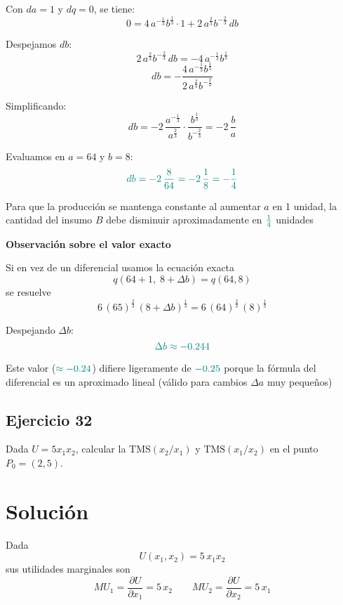 \documentclass{article}
\begin{document}
Con \(da = 1\) y \(dq = 0\), se tiene:
\[
0 = 4\, a^{-\frac{1}{3}}b^{\frac{1}{3}} \cdot 1 + 2\, a^{\frac{2}{3}}b^{-\frac{2}{3}}\, db
\]

Despejamos \(db\):
\[
2\, a^{\frac{2}{3}}b^{-\frac{2}{3}}\, db = -4\, a^{-\frac{1}{3}}b^{\frac{1}{3}}
\]
\[
db = -\frac{4\, a^{-\frac{1}{3}}b^{\frac{1}{3}}}{2\, a^{\frac{2}{3}}b^{-\frac{2}{3}}}
\]

Simplificando:
\[
db = -2\, \frac{a^{-\frac{1}{3}}}{a^{\frac{2}{3}}} \cdot \frac{b^{\frac{1}{3}}}{b^{-\frac{2}{3}}} = -2\, \frac{b}{a}
\]

Evaluamos en \(a = 64\) y \(b = 8\):
\[
\color{teal}
db = -2\, \frac{8}{64} = -2\, \frac{1}{8} = -\frac{1}{4}
\]

\bigskip

Para que la producción se mantenga constante al aumentar \(a\) en 1 unidad, la cantidad del insumo \(B\) debe disminuir aproximadamente en \(\color{teal} \frac{1}{4}\) unidades

\bigskip

\textbf{Observación sobre el valor exacto}

Si en vez de un diferencial usamos la ecuación exacta
\[
q(64+1,\;8+\Delta b) = q(64,8)
\]
se resuelve
\[
6\,(65)^{\tfrac{2}{3}}\,(8 + \Delta b)^{\tfrac{1}{3}}
=
6\,(64)^{\tfrac{2}{3}}\,(8)^{\tfrac{1}{3}}
\]

Despejando \(\Delta b\):
\[
\color{teal}
\Delta b \approx -0.244
\]

Este valor (\(\color{teal} \approx -0.24\)) difiere ligeramente de \(\color{teal} -0.25\) porque la fórmula del diferencial es un {\color{teal} aproximado lineal} (válido para cambios \(\Delta a\) muy pequeños)


\newpage

\subsection{Ejercicio 32}

Dada \( U = 5x_1x_2 \), calcular la \( \text{TMS}(x_2/x_1) \) y \( \text{TMS}(x_1/x_2) \) en el punto \( P_0 = (2,5) \).

\newpage
\section*{Solución}

Dada
\[
U(x_1,x_2)=5\,x_1x_2
\]
sus utilidades marginales son
\[
MU_{1}=\frac{\partial U}{\partial x_1}=5\,x_2
\qquad
MU_{2}=\frac{\partial U}{\partial x_2}=5\,x_1
\]
\end{document}
